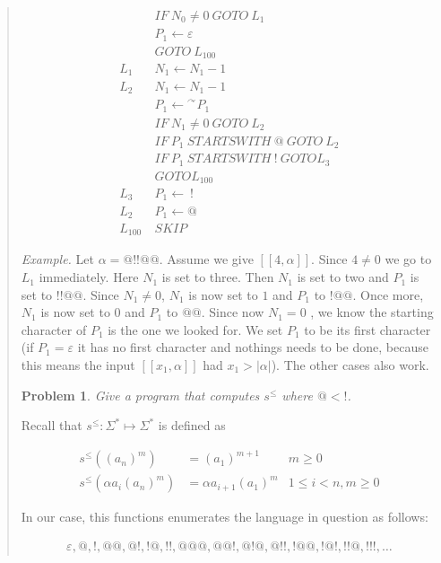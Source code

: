 \documentclass[a4paper, 12pt]{article}
\newtheorem{problem}{Problem}
\newtheorem{problem}{Problem}
\begin{document}
\begin{quote}
\begin{align*}
    &IF ~ N_0 \neq 0 ~ GOTO ~ L_1 \\ 
    &P_1 \leftarrow \varepsilon \\ 
    & GOTO ~ L_{100} \\
    L_1 ~ & N_1 \leftarrow N_1 - 1 \\ 
    L_2 ~ & N_1 \leftarrow N_1 - 1 \\ 
          &P_1 \leftarrow {}^{\curvearrowright} P_1\\
    &IF ~ N_1 \neq 0 ~ GOTO ~ L_2\\
    &IF ~ P_1 ~ STARTSWITH ~ @ ~ GOTO ~ L_2 \\ 
    &IF ~ P_1 ~ STARTSWITH ~ ! ~ GOTO L_3\\ 
    & GOTO L_{100}\\
    L_3~&P_1 \leftarrow ~ !\\
    L_2 ~ &P_1 \leftarrow  @ \\ 
    L_{100} ~ & SKIP
\end{align*}

\textit{Example.} Let $\alpha = @!!@@$. Assume we give $[\![ 4, \alpha ]\!]$.
Since $4 \neq 0$ we go to $L_1$ immediately. Here $N_1$ is set to three. Then
$N_1$ is set to two and $P_1$ is set to $!!@@$. Since $N_1 \neq 0$, $N_1$ is now
set to $1$ and $P_1$ to $!@@$. Once more, $N_1$ is now set to $0$ and $P_1$ to
$@@$. Since now $N_1 = 0$ , we know the starting character of $P_1$ is the one
we looked for. We set $P_1$ to be its first character (if $P_1 = \varepsilon$ it
has no first character and nothings needs to be done, because this means the
input $[\![ x_1, \alpha ]\!]$ had $x_1 > |\alpha|$). The other cases also work.

\begin{problem}
    Give a program that computes $s^{\leq}$ where $@ < !$.
\end{problem}

Recall that $s^{\leq} : \Sigma^{*} \mapsto \Sigma^{*}$ is defined as 

\begin{align*}
    s^{\leq} \left( (a_n)^m \right)  &= (a_1)^{m + 1} & m \geq 0\\ 
    s^{\leq} \left( \alpha a_i (a_n)^{m} \right) &= \alpha a_{i+1} (a_1)^{m} & 1
    \leq i < n, m \geq 0
\end{align*}

In our case, this functions enumerates the language in question as follows: 

\begin{align*}
    \varepsilon, @, !, @ @, @ !, !@, !!, @@@, @@!, @!@, @!!, !@@, !@!, !!@, !!!, \ldots
\end{align*}
\end{quote}
\normalsize
\end{document}
